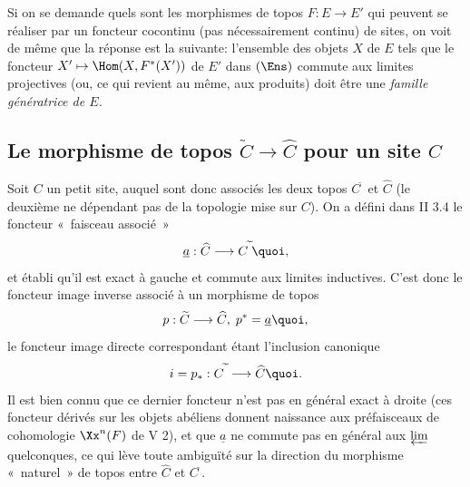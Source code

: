 \documentclass[10pt]{../fichiers-configuration-latex/smfart}
\begin{document}
\subsubsection{}
Si on se demande quels sont les morphismes de topos $F:E\rightarrow
E'$ qui peuvent se réaliser par un foncteur cocontinu (pas
nécessairement continu) de sites, on voit de même que la
réponse est la suivante: l'ensemble des objets $X$ de $E$ tels que
le foncteur $X'\mapsto \Hom(X,F^{\ast}(X'))$ de $E'$ dans $(\Ens)$
commute aux limites projectives (ou, ce qui revient au même, aux
produits) doit être une \emph{famille génératrice de $E$.}

\subsection{Le morphisme de topos $\widetilde{C}\rightarrow
\widehat{C}$ pour un site $C$}

Soit $C$ un petit site, auquel sont donc associés les deux topos
$C^{\widetilde{\phantom{,}}}$ et $\widehat{C}$ (le deuxième ne
dépendant pas de la topologie mise sur $C$). On a défini dans II
3.4 le foncteur « faisceau associé »
$$
\underline{a}:\widehat{C}\longrightarrow
C^{\widetilde{\phantom{,}}}{\quoi},
$$
et établi qu'il est exact à gauche et commute aux limites
inductives. C'est donc le foncteur image inverse associé à un
morphisme de topos
$$
p:\widetilde{C}\longrightarrow \widehat{C},\;
p^{\ast}=\underline{a}{\quoi},
$$
le foncteur image directe correspondant étant l'inclusion
canonique
$$
i=p_{\ast}:C^{\widetilde{\phantom{,}}}\longrightarrow
\widehat{C}{\quoi}.
$$
Il est bien connu que ce dernier foncteur n'est pas en général exact
à droite (ces foncteur dérivés sur les objets abéliens donnent
naissance aux préfaisceaux de cohomologie $\Xx^n(F)$ de V 2), et que
$\underline{a}$ ne commute pas en général aux $\varprojlim$ quelconques,
ce qui lève toute ambiguïté sur la direction du morphisme « naturel »  de topos entre $\widehat{C}$ et
$C^{\widetilde{\phantom{,}}}$.
\end{document}

